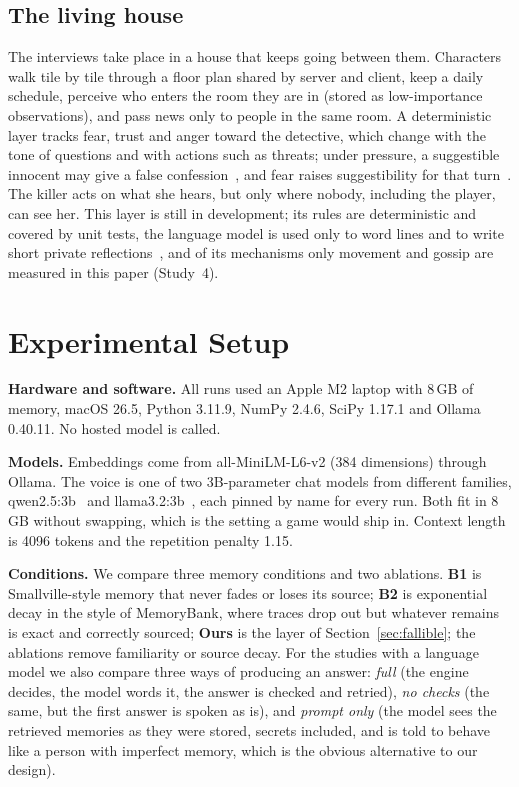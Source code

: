 \documentclass[conference]{IEEEtran}
\begin{document}
\subsection{The living house}
\label{sec:house}
The interviews take place in a house that keeps going between them. Characters walk tile by tile
through a floor plan shared by server and client, keep a daily schedule, perceive who enters the room
they are in (stored as low-importance observations), and pass news only to people in the same room. A
deterministic layer tracks fear, trust and anger toward the detective, which change with the tone of
questions and with actions such as threats; under pressure, a suggestible innocent may give a false
confession~\cite{kassin1996}, and fear raises suggestibility for that turn~\cite{gudjonsson1984}. The
killer acts on what she hears, but only where nobody, including the player, can see her. This layer is
still in development; its rules are deterministic and covered by unit tests, the language model is used
only to word lines and to write short private reflections~\cite{park2023generative}, and of its
mechanisms only movement and gossip are measured in this paper (Study~4).

\section{Experimental Setup}
\label{sec:setup}

\textbf{Hardware and software.} All runs used an Apple M2 laptop with 8\,GB of memory, macOS 26.5,
Python 3.11.9, NumPy 2.4.6, SciPy 1.17.1 and Ollama 0.40.11. No hosted model is called.

\textbf{Models.} Embeddings come from all-MiniLM-L6-v2 (384 dimensions) through Ollama. The voice is
one of two 3B-parameter chat models from different families, qwen2.5:3b~\cite{qwen2024} and
llama3.2:3b~\cite{llama3}, each pinned by name for every run. Both fit in 8\,GB without swapping, which
is the setting a game would ship in. Context length is 4096 tokens and the repetition penalty 1.15.

\textbf{Conditions.} We compare three memory conditions and two ablations. \textbf{B1} is
Smallville-style memory that never fades or loses its source; \textbf{B2} is exponential decay in the
style of MemoryBank, where traces drop out but whatever remains is exact and correctly sourced;
\textbf{Ours} is the layer of Section~\ref{sec:fallible}; the ablations remove familiarity or source
decay. For the studies with a language model we also compare three ways of producing an answer:
\emph{full} (the engine decides, the model words it, the answer is checked and retried),
\emph{no checks} (the same, but the first answer is spoken as is), and \emph{prompt only} (the model
sees the retrieved memories as they were stored, secrets included, and is told to behave like a
person with imperfect memory, which is the obvious alternative to our design).
\end{document}
